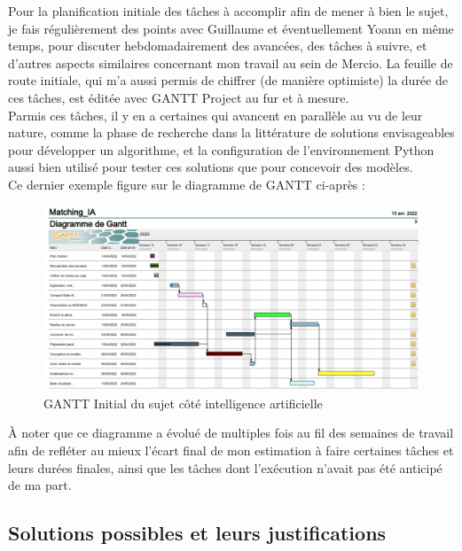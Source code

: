 \documentclass{rapportCS}
\begin{document}
Pour la planification initiale des tâches à accomplir afin de mener à bien le sujet, je fais régulièrement des 
points avec Guillaume et éventuellement Yoann en même temps, pour discuter hebdomadairement des avancées, des
tâches à suivre, et d'autres aspects similaires concernant mon travail au sein de Mercio.
La feuille de route initiale, qui m'a aussi permis de chiffrer (de manière optimiste) la durée de ces tâches,
est éditée avec GANTT Project au fur et à mesure. \\

Parmis ces tâches, il y en a certaines qui avancent en parallèle au vu de leur nature,
comme la phase de recherche dans la littérature de solutions envisageables pour développer 
un algorithme, et la configuration de l'environnement Python aussi bien 
utilisé pour tester ces solutions que pour concevoir des modèles.\\
Ce dernier exemple figure sur le diagramme de GANTT ci-après :\\

\begin{figure}[h!]
  \centerline{\includegraphics[width=20cm]{images/gantt_init.png}}
  \caption{\label{GANTT initial} GANTT Initial du sujet côté intelligence artificielle}
  \end{figure}

À noter que ce diagramme a évolué de multiples fois au fil des semaines de travail afin de refléter au mieux
l'écart final de mon estimation à faire certaines tâches et leurs durées finales, ainsi que les tâches dont 
l'exécution n'avait pas été anticipé de ma part.

\newpage

\subsection{Solutions possibles et leurs justifications}
\end{document}
